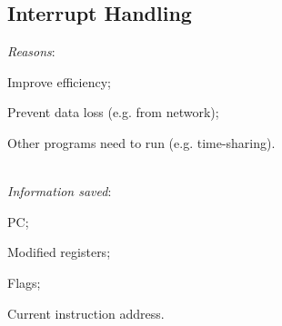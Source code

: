 \subsection*{Interrupt Handling}
\emph{Reasons}: \begin{enumerate*}[label=(\arabic*)]
    \item Improve efficiency;
    \item Prevent data loss (e.g. from network);
    \item Other programs need to run (e.g. time-sharing).
\end{enumerate*}\\
\emph{Information saved}: \begin{enumerate*}[label=(\arabic*)]
    \item PC;
    \item Modified registers;
    \item Flags;
    \item Current instruction address.
\end{enumerate*}